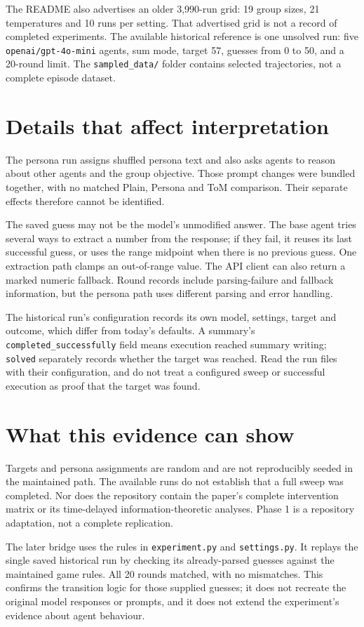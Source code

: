 \documentclass[12pt,a4paper,oneside]{report}
\begin{document}
The README also advertises an older 3,990-run grid: 19 group sizes, 21 temperatures and 10 runs per setting. That advertised grid is not a record of completed experiments. The available historical reference is one unsolved run: five \texttt{openai/gpt-4o-mini} agents, sum mode, target 57, guesses from 0 to 50, and a 20-round limit. The \texttt{sampled\allowbreak\_data/} folder contains selected trajectories, not a complete episode dataset.

\section{Details that affect interpretation}
The persona run assigns shuffled persona text and also asks agents to reason about other agents and the group objective. Those prompt changes were bundled together, with no matched Plain, Persona and ToM comparison. Their separate effects therefore cannot be identified.

The saved guess may not be the model’s unmodified answer. The base agent tries several ways to extract a number from the response; if they fail, it reuses its last successful guess, or uses the range midpoint when there is no previous guess. One extraction path clamps an out-of-range value. The API client can also return a marked numeric fallback. Round records include parsing-failure and fallback information, but the persona path uses different parsing and error handling.

The historical run’s configuration records its own model, settings, target and outcome, which differ from today’s defaults. A summary’s \texttt{completed\allowbreak\_successfully} field means execution reached summary writing; \texttt{solved} separately records whether the target was reached. Read the run files with their configuration, and do not treat a configured sweep or successful execution as proof that the target was found.

\section{What this evidence can show}
Targets and persona assignments are random and are not reproducibly seeded in the maintained path. The available runs do not establish that a full sweep was completed. Nor does the repository contain the paper’s complete intervention matrix or its time-delayed information-theoretic analyses. Phase 1 is a repository adaptation, not a complete replication.

The later bridge uses the rules in \texttt{experiment.py} and \texttt{settings.py}. It replays the single saved historical run by checking its already-parsed guesses against the maintained game rules. All 20 rounds matched, with no mismatches. This confirms the transition logic for those supplied guesses; it does not recreate the original model responses or prompts, and it does not extend the experiment’s evidence about agent behaviour.
\end{document}
